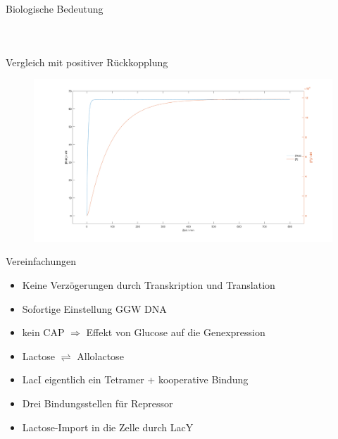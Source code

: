 \documentclass[11pt,aspectratio=169,reqno]{beamer}
\begin{document}
\begin{frame}{Biologische Bedeutung}
\begin{columns}
        \begin{figure}
            \centering
        \end{figure}
    \end{columns}


\end{frame}

\begin{frame}{Vergleich mit positiver Rückkopplung}
\begin{figure}
    \centering
    \includegraphics[width=\textwidth]{images/positive_autoregulation_basic.m.png}
\end{figure}
\end{frame}

\begin{frame}{Vereinfachungen}
    \begin{itemize}
        \item Keine Verzögerungen durch Transkription und Translation
        \item Sofortige Einstellung GGW DNA

        \item kein CAP $\Rightarrow$ Effekt von Glucose auf die Genexpression
        \item Lactose $\rightleftharpoons$ Allolactose
        \item LacI eigentlich ein Tetramer + kooperative Bindung
        \item Drei Bindungsstellen für Repressor
        \item Lactose-Import in die Zelle durch LacY
    \end{itemize}
\end{frame}
\end{document}
